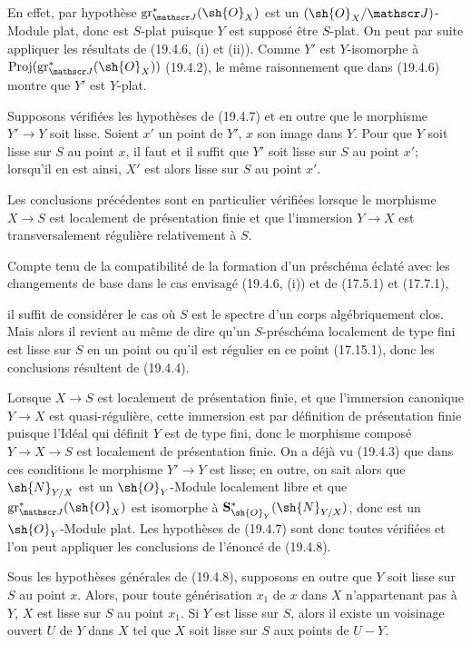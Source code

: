 En effet, par hypothèse $\operatorname{gr}_{\mathscr J}^*(\sh{O}_X)$ est un $(\sh{O}_X/\mathscr J)$-Module plat, donc est $S$-plat puisque $Y$ est supposé être $S$-plat. On peut par suite appliquer les résultats de (19.4.6, (i) et (ii)). Comme $Y'$ est $Y$-isomorphe à $\operatorname{Proj}(\operatorname{gr}_{\mathscr J}^*(\sh{O}_X))$ (19.4.2), le même raisonnement que dans (19.4.6) montre que $Y'$ est $Y$-plat.

\begin{proposition}[19.4.8]
\label{IV.19.4.8}
Supposons vérifiées les hypothèses de (19.4.7) et en outre que le morphisme $Y'\to Y$ soit lisse. Soient $x'$ un point de $Y'$, $x$ son image dans $Y$. Pour que $Y$ soit lisse sur $S$ au point $x$, il faut et il suffit que $Y'$ soit lisse sur $S$ au point $x'$; lorsqu'il en est ainsi, $X'$ est alors lisse sur $S$ au point $x'$.

Les conclusions précédentes sont en particulier vérifiées lorsque le morphisme $X\to S$ est localement de présentation finie et que l'immersion $Y\to X$ est transversalement régulière relativement à $S$.
\end{proposition}

Compte tenu de la compatibilité de la formation d'un préschéma éclaté avec les changements de base dans le cas envisagé (19.4.6, (i)) et de (17.5.1) et (17.7.1),


il suffit de considérer le cas où $S$ est le spectre d'un corps algébriquement clos. Mais alors il revient au même de dire qu'un $S$-préschéma localement de type fini est lisse sur $S$ en un point ou qu'il est régulier en ce point (17.15.1), donc les conclusions résultent de (19.4.4).

Lorsque $X\to S$ est localement de présentation finie, et que l'immersion canonique $Y\to X$ est quasi-régulière, cette immersion est par définition de présentation finie puisque l'Idéal qui définit $Y$ est de type fini, donc le morphisme composé $Y\to X\to S$ est localement de présentation finie. On a déjà vu (19.4.3) que dans ces conditions le morphisme $Y'\to Y$ est lisse; en outre, on sait alors que $\sh{N}_{Y/X}$ est un $\sh{O}_Y$-Module localement libre et que $\operatorname{gr}_{\mathscr J}^*(\sh{O}_X)$ est isomorphe à $\mathbf S_{\sh{O}_Y}^*(\sh{N}_{Y/X})$, donc est un $\sh{O}_Y$-Module plat. Les hypothèses de (19.4.7) sont donc toutes vérifiées et l'on peut appliquer les conclusions de l'énoncé de (19.4.8).

\begin{corollary}[19.4.9]
\label{IV.19.4.9}
Sous les hypothèses générales de (19.4.8), supposons en outre que $Y$ soit lisse sur $S$ au point $x$. Alors, pour toute générisation $x_1$ de $x$ dans $X$ n'appartenant pas à $Y$, $X$ est lisse sur $S$ au point $x_1$. Si $Y$ est lisse sur $S$, alors il existe un voisinage ouvert $U$ de $Y$ dans $X$ tel que $X$ soit lisse sur $S$ aux points de $U-Y$.
\end{corollary}

